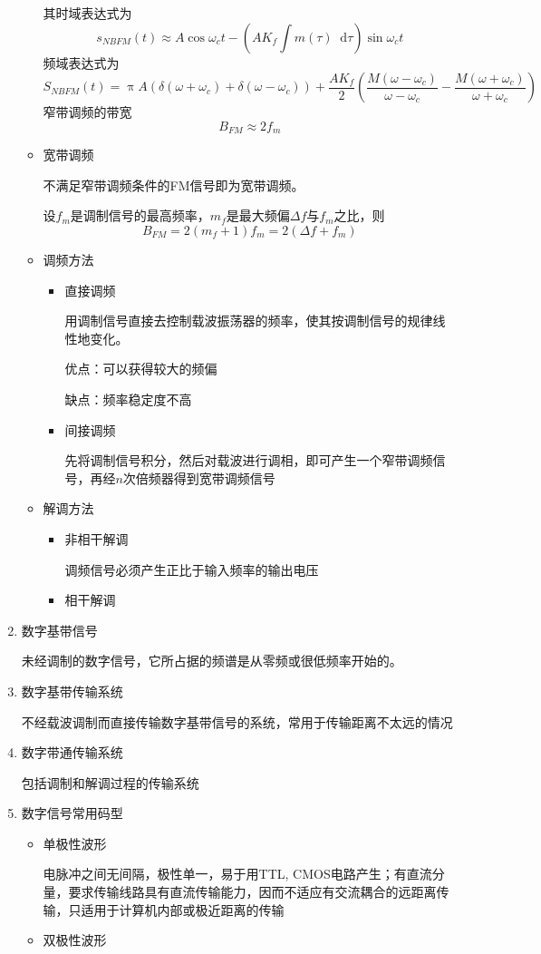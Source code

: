 \documentclass[UTF8]{ctexrep}
\newcommand{\dif}{\mathop{}\!{}\mathrm{d}}
\def\pth#1{\left( {#1}\right)}
\begin{document}
\begin{enumerate}
\begin{itemize}
其时域表达式为
\[s_{NBFM}(t)\approx A\cos\omega_ct-\pth{AK_f\int m\pth{\tau}\dif\tau}\sin\omega_ct\]
频域表达式为
\[S_{NBFM}(t)=\uppi A\pth{\delta\pth{\omega+\omega_c}+\delta\pth{\omega -\omega_c}}+\frac{AK_f}{2}\pth{\frac{M\pth{\omega-\omega_c}}{\omega-\omega_c}-\frac{M\pth{\omega +\omega_c}}{\omega+\omega_c}}\]
窄带调频的带宽
\[B_{FM}\approx 2f_m\]
\item 宽带调频\par
不满足窄带调频条件的FM信号即为宽带调频。\par
设$f_m$是调制信号的最高频率，$m_f$是最大频偏$\Delta f$与$f_m$之比，则
\[B_{FM}=2\pth{m_f+1}f_m=2\pth{\Delta f+f_m}\]
\item 调频方法
\begin{itemize}
\item 直接调频\par
用调制信号直接去控制载波振荡器的频率，使其按调制信号的规律线性地变化。\par
优点：可以获得较大的频偏\par
缺点：频率稳定度不高
\item 间接调频\par
先将调制信号积分，然后对载波进行调相，即可产生一个窄带调频信号，再经$n$次倍频器得到宽带调频信号
\end{itemize}
\item 解调方法
\begin{itemize}
\item 非相干解调\par
调频信号必须产生正比于输入频率的输出电压
\item 相干解调
\end{itemize}
\end{itemize}
\item 数字基带信号\par
未经调制的数字信号，它所占据的频谱是从零频或很低频率开始的。
\item 数字基带传输系统\par
不经载波调制而直接传输数字基带信号的系统，常用于传输距离不太远的情况
\item 数字带通传输系统\par
包括调制和解调过程的传输系统
\item 数字信号常用码型
\begin{itemize}
\item 单极性波形\par
电脉冲之间无间隔，极性单一，易于用TTL, CMOS电路产生；有直流分量，要求传输线路具有直流传输能力，因而不适应有交流耦合的远距离传输，只适用于计算机内部或极近距离的传输
\item 双极性波形\par

\end{itemize}
\end{enumerate}
\end{document}
